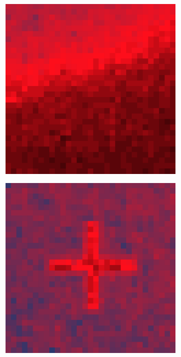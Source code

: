 \documentclass[10pt]{scrartcl}
\begin{document}
\begin{figure}[!ht]
    \begin{subfigure}[b]{.3\linewidth}
        \centering
        \includegraphics[width=1.2\linewidth]{../plots_tables_images/1d1dcrop_5_0.eps}
    \end{subfigure}
    \begin{subfigure}[b]{.3\linewidth}
        \centering
        \includegraphics[width=1.2\linewidth]{../plots_tables_images/1d1dcrop_5_6.eps}

\end{subfigure}
\end{figure}
\end{document}
